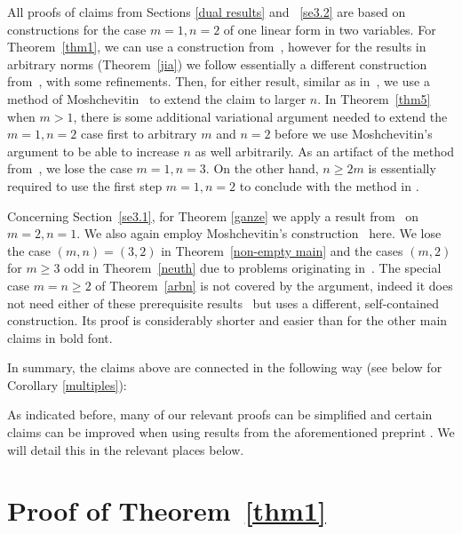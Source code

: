 \documentclass[10pt]{amsart}
\theoremstyle{definition}
\begin{document}
All proofs of claims from Sections 
 \ref{dual results} and ~\ref{se3.2} are based on constructions for the case $m=1, n=2$ of one linear form in two variables. For Theorem~\ref{thm1}, we can use a construction from~\cite{j2}, however for the results in arbitrary norms (Theorem~\ref{jia}) we follow 
essentially a different construction from~\cite{j3}, with some refinements.
Then, for either result, similar as in~\cite{j3}, we use a method of Moshchevitin~\cite{ngm}
to extend the claim to larger $n$. In Theorem~\ref{thm5} when $m>1$, 
there is some additional variational argument needed to extend the $m=1, n=2$
case first to arbitrary $m$ and $n=2$ before we use Moshchevitin's argument
to be able to increase $n$ as well arbitrarily. As an artifact of the method
from~\cite{ngm}, 
we lose the case $m=1, n=3$.
On the other hand, $n\ge 2m$ is essentially required to use the first step $m=1, n=2$ to conclude with the method in \cite{ngm}. 

Concerning Section~\ref{se3.1},
for Theorem \ref{ganze} we apply
a result from~\cite{j1} on $m=2, n=1$. 
We also again employ Moshchevitin's construction~\cite{ngm} here.  
We 
lose the case $(m,n)=(3,2)$ in Theorem~\ref{non-empty main} and the cases $(m,2)$ for $m\ge 3$ odd in Theorem~\ref{neuth}
due to problems originating in~\cite{j1}.
The special case $m=n\ge 2$ of Theorem~\ref{arbn} is not covered by the argument, indeed it does not need either of these prerequisite results~\cite{ngm, j1} but uses a different, self-contained construction. Its proof is considerably
shorter and easier than for the other main claims in bold font.

In summary, the claims above are connected in the following way (see below
for Corollary \ref{multiples}):
\medskip

\begin{figure}[omitted: a diagram of this paper's results, not reproduced here]\end{figure}

 As indicated before,
many of our relevant proofs can be simplified and certain claims can be improved when using results from the aforementioned preprint \cite{AginWeiss2024}. We will detail this in the relevant places below.


\section{Proof of Theorem~\ref{thm1}}
\end{document}

